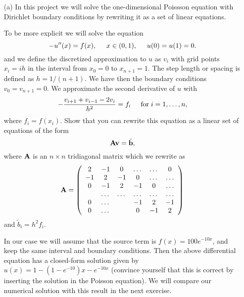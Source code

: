 \documentclass[11pt,a4wide]{article}
\begin{document}
\begin{enumerate}
\item[(a)] 
In this project we will solve the one-dimensional Poissson equation
with Dirichlet boundary conditions by rewriting it as a set of linear equations.


To be more explicit we will solve the equation
\[
-u''(x) = f(x), \hspace{0.5cm} x\in(0,1), \hspace{0.5cm} u(0) = u(1) = 0.
\]
and we define the discretized approximation  to $u$ as $v_i$  with 
grid points $x_i=ih$   in the interval from $x_0=0$ to $x_{n+1}=1$.
The step length or spacing is defined as $h=1/(n+1)$. 
We have then the boundary conditions $v_0 = v_{n+1} = 0$.
We  approximate the second
derivative of $u$ with 
\[
   -\frac{v_{i+1}+v_{i-1}-2v_i}{h^2} = f_i  \hspace{0.5cm} \mathrm{for} \hspace{0.1cm} i=1,\dots, n,
\]
where $f_i=f(x_i)$.
Show that you can rewrite this equation as a linear set of equations of the form 
\[
   {\bf A}{\bf v} = \tilde{{\bf b}},
\]
where ${\bf A}$ is an $n\times n$  tridiagonal matrix which we rewrite as 
\begin{equation}
    {\bf A} = \left(\begin{array}{cccccc}
                           2& -1& 0 &\dots   & \dots &0 \\
                           -1 & 2 & -1 &0 &\dots &\dots \\
                           0&-1 &2 & -1 & 0 & \dots \\
                           & \dots   & \dots &\dots   &\dots & \dots \\
                           0&\dots   &  &-1 &2& -1 \\
                           0&\dots    &  & 0  &-1 & 2 \\
                      \end{array} \right)
\end{equation}
and $\tilde{b}_i=h^2f_i$.


In our case we will assume  that the source term is 
$f(x) = 100e^{-10x}$, and keep the same interval and boundary 
conditions. Then the above differential equation
has a closed-form  solution given by $u(x) = 1-(1-e^{-10})x-e^{-10x}$ (convince yourself that this is correct by inserting the
solution in the Poisson equation).  We will compare
our numerical solution with this result in the next exercise. 


\end{enumerate}
\end{document}
